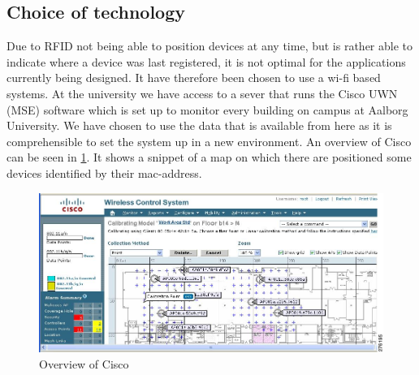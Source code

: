 


\subsection{Choice of technology}\label{subsec:cisco}
Due to RFID not being able to position devices at any time, but is rather able to indicate where a device was last registered, it is not optimal for the applications currently being designed. It have therefore been chosen to use a wi-fi based systems.
At the university we have access to a sever that runs the Cisco UWN (MSE) software which is set up to monitor every building on campus at Aalborg University. We have chosen to use the data that is available from here as it is comprehensible to set the system up in a new environment. An overview of Cisco can be seen in \cref{fig:cisco_overveiw}. It shows a snippet of a map on which there are positioned some devices identified by their mac-address.

\begin{figure}[h]
	\begin{center}
	\includegraphics[scale=1]{graphics/cisco_overview.png}
	\caption{Overview of Cisco\cite{cisco_overview}}
	\label{fig:cisco_overveiw}
	\end{center}
\end{figure}

